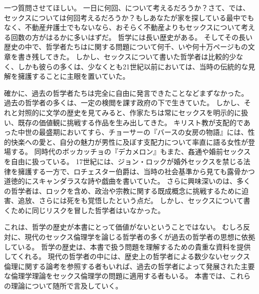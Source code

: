 \documentclass[paper=a4,book,openany]{jlreq}
\newcommand{\ig}[1]{}           %
\begin{document}
一つ質問させてほしい。
一日に何回、について考えるだろうか？さて、では、セックスについては何回考えるだろうか？もしあなたが家を探している最中でもなく、不動産弁護士でもないなら、おそらく不動産よりもセックスについて考える回数の方がはるかに多いはずだ。
哲学には長い歴史がある。
そしてその長い歴史の中で、哲学者たちはに関する問題について何千、いや何十万ページもの文章を書き残してきた。
しかし、セックスについて書いた哲学者は比較的少なく、しかも彼らの多くは、少なくとも21世紀以前においては、当時の伝統的な見解を擁護することに主眼を置いていた。

確かに、過去の哲学者たちは完全に自由に発言できたことなどまずなかった。
過去の哲学者の多くは、一定の検閲を課す政府の下で生きていた。
しかし、それと対照的に文学の歴史を見てみると、作家たちは常にセックスを明示的に扱い、既存の価値観に挑戦する作品を生み出してきた。
キリスト教が支配的であった中世の最盛期においてすら、チョーサーの『バースの女房の物語』には、性的快楽への愛と、自分の魅力が男性に及ぼす支配力について率直に語る女性が登場する。
同時代のボッカッチョの『デカメロン』もまた、姦通や婚前セックスを自由に扱っている。
17世紀には、ジョン・ロックが婚外セックスを禁じる法律を擁護する一方で、ロチェスター伯爵\ig{\footnote{2nd Earl of Rochester, 1647-1680、イングランドの貴族、宮廷詩人。
}}は、当時の社会基準から見ても露骨かつ道徳的にスキャンダラスな詩や戯曲を書いていた。
さらに興味深いのは、多くの哲学者は、ロックを含め、政治や宗教に関する既成概念に挑戦するために迫害、追放、さらには死をも覚悟したという点だ。
しかし、セックスについて書くために同じリスクを冒した哲学者はいなかった。

これは、哲学の歴史が本書にとって価値がないということではない。
むしろ反対に、現代のセックス倫理学を論じる哲学者の多くが過去の哲学者の思想に依拠している。
哲学の歴史は、本書で扱う問題を理解するための貴重な資料を提供してくれる。
現代の哲学者の中には、歴史上の哲学者による数少ないセックス倫理に関する論考を参照する者もいれば、過去の哲学者によって発展された主要な倫理学理論をセックス倫理学の問題に適用する者もいる。
本書では、これらの理論について随所で言及していく。
\end{document}
